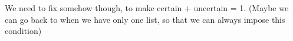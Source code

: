 \documentclass{icmmcm}
\begin{document}
		We need to fix somehow though, to make certain + uncertain = 1.
		(Maybe we can go back to when we have only one list, so that we can
		always impose this condition)
%

\end{document}
